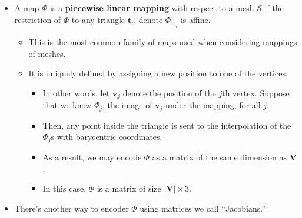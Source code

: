 \documentclass[10pt]{article}
\newcommand{\ve}[1]{\mathbf{#1}}
\newcommand{\mcal}[1]{\mathcal{#1}}
\begin{document}
\begin{itemize}
    \item A map $\Phi$ is a {\bf piecewise linear mapping} with respect to a mesh $\mcal{S}$ if the restriction of $\Phi$ to any triangle $\ve{t}_i$, denote $\Phi|_{\ve{t}_i}$ is affine.
    \begin{itemize}
        \item This is the most common family of maps used when considering mappings of meshes.
        \item It is uniquely defined by assigning a new position to one of the vertices.
        \begin{itemize}
            \item In other words, let $\ve{v}_j$ denote the position of the $j$th vertex. Suppose that we know $\Phi_j$, the image of $\ve{v}_j$ under the mapping, for all $j$.
            
            \item Then, any point inside the triangle is sent to the interpolation of the $\Phi_j$s with barycentric coordinates.            
            
            \item As a result, we may encode $\Phi$ as a matrix of the same dimension as $\ve{V}$.
            
            \item In this case, $\Phi$ is a matrix of size $|\ve{V}| \times 3$.            
        \end{itemize}        
    \end{itemize}
    
    \item There's another way to encoder $\Phi$ using matrices we call ``Jacobians.''
    

\end{itemize}
\end{document}
